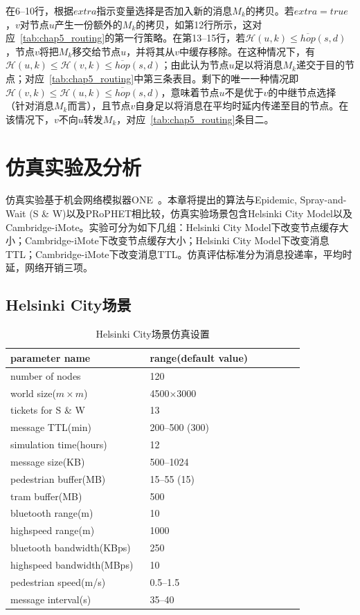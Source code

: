 在6--10行，根据$extra$指示变量选择是否加入新的消息$M_k$的拷贝。若$extra=true$，$v$对节点$u$产生一份额外的$M_k$的拷贝，如第12行所示，这对应\tablename~\ref{tab:chap5_routing}的第一行策略。在第13--15行，若$\mathcal{H}(u,k)\leq\overline{hop}(s,d)$，节点$v$将把$M_k$移交给节点$u$，并将其从$v$中缓存移除。在这种情况下，有$\mathcal{H}(u,k)\leq\mathcal{H}(v,k)\leq\overline{hop}(s,d)$；由此认为节点$u$足以将消息$M_k$递交于目的节点；对应\tablename~\ref{tab:chap5_routing}中第三条表目。剩下的唯一一种情况即$\mathcal{H}(v,k)\leq\mathcal{H}(u,k)\leq\overline{hop}(s,d)$，意味着节点$u$不是优于$v$的中继节点选择（针对消息$M_k$而言），且节点$v$自身足以将消息在平均时延内传递至目的节点。在该情况下，$v$不向$u$转发$M_k$，对应\tablename~\ref{tab:chap5_routing}条目二。

\section{仿真实验及分析}
\label{chap5:仿真实验}

仿真实验基于机会网络模拟器ONE~。本章将提出的算法与Epidemic, Spray-and-Wait (S \& W)以及PRoPHET相比较，仿真实验场景包含Helsinki City Model以及Cambridge-iMote。实验可分为如下几组：Helsinki City Model下改变节点缓存大小；Cambridge-iMote下改变节点缓存大小；Helsinki City Model下改变消息TTL；Cambridge-iMote下改变消息TTL。仿真评估标准分为消息投递率，平均时延，网络开销三项。

\subsection{Helsinki City场景}



\begin{table}
\centering
\caption{Helsinki City场景仿真设置}
\label{tab:chap5_simulation_helsinki}
\begin{tabular}{
p{0.45\linewidth}<{\centering}
p{0.5\linewidth}<{\centering}
}
\hline
\textbf{parameter name} & \textbf{range(default value)} \\
\hline
number of nodes & 120  \\
world size($m\times m$) & 4500$\times$3000  \\
tickets for S \& W & 13 \\
message TTL(min) & 200--500 (300) \\
simulation time(hours) & 12 \\
message size(KB) & 500--1024 \\
pedestrian buffer(MB) & 15--55 (15) \\
tram buffer(MB) & 500 \\
bluetooth range(m) & 10 \\
highspeed range(m) & 1000 \\ 
bluetooth bandwidth(KBps) & 250 \\
highspeed bandwidth(MBps) & 10 \\ 
pedestrian speed(m/s) & 0.5--1.5  \\
message interval(s) & 35--40 \\
\hline
\end{tabular}
\end{table}

